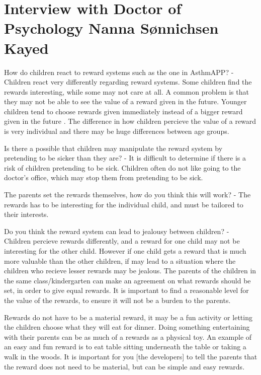 \section{Interview with Doctor of Psychology Nanna S\o nnichsen Kayed}
\label{sec:psychinterview}

How do children react to reward systems such as the one in AsthmAPP?
- Children react very differently regarding reward systems. Some children find the rewards interesting, while some may not care at all. A common problem is that they may not be able to see the value of a reward given in the future. Younger children tend to choose rewards given immediately instead of a bigger reward given in the future \cite{mischel1972cognitive}.
The difference in how children percieve the value of a reward is very individual and there may be huge differences between age groups. 


Is there a possible that children may manipulate the reward system by pretending to be sicker than they are?
- It is difficult to determine if there is a risk of children pretending to be sick. Children often do not like going to the doctor's office, which may stop them from pretending to be sick.


The parents set the rewards themselves, how do you think this will work?
- The rewards has to be interesting for the individual child, and must be tailored to their interests. 

Do you think the reward system can lead to jealousy between children?
- Children percieve rewards differently, and a reward for one child may not be interesting for the other child. However if one child gets a reward that is much more valuable than the other children, if may lead to a situation where the children who recieve lesser rewards may be jealous. The parents of the children in the same class/kindergarten can make an agreement on what rewards should be set, in order to give equal rewards. It is important to find a reasonable level for the value of the rewards, to ensure it will not be a burden to the parents.


Rewards do not have to be a material reward, it may be a fun activity or letting the children choose what they will eat for dinner. Doing something entertaining with their parents can be as much of a rewards as a physical toy. An example of an easy and fun reward is to eat table sitting underneath the table or taking a walk in the woods. It is important for you [the developers] to tell the parents that the reward does not need to be material, but can be simple and easy rewards.


